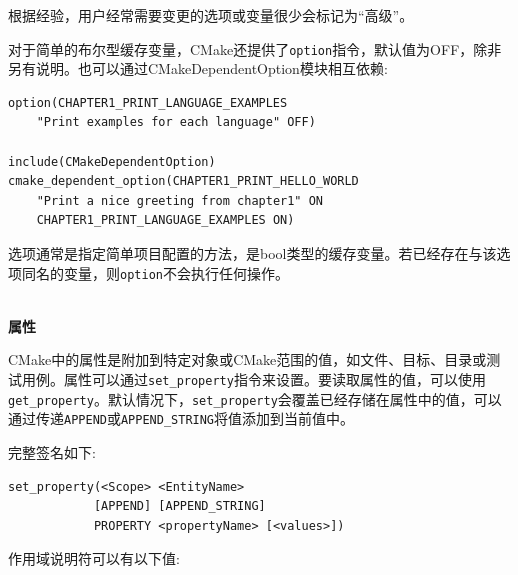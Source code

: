 根据经验，用户经常需要变更的选项或变量很少会标记为“高级”。

对于简单的布尔型缓存变量，CMake还提供了\texttt{option}指令，默认值为OFF，除非另有说明。也可以通过CMakeDependentOption模块相互依赖:

\begin{lstlisting}[style=styleCMake]
option(CHAPTER1_PRINT_LANGUAGE_EXAMPLES
	"Print examples for each language" OFF)

include(CMakeDependentOption)
cmake_dependent_option(CHAPTER1_PRINT_HELLO_WORLD
	"Print a nice greeting from chapter1" ON
	CHAPTER1_PRINT_LANGUAGE_EXAMPLES ON)
\end{lstlisting}

选项通常是指定简单项目配置的方法，是bool类型的缓存变量。若已经存在与该选项同名的变量，则\texttt{option}不会执行任何操作。

\hspace*{\fill} \\ %
\noindent
\textbf{属性}

CMake中的属性是附加到特定对象或CMake范围的值，如文件、目标、目录或测试用例。属性可以通过\texttt{set\_property}指令来设置。要读取属性的值，可以使用\texttt{get\_property}。默认情况下，\texttt{set\_property}会覆盖已经存储在属性中的值，可以通过传递\texttt{APPEND}或\texttt{APPEND\_STRING}将值添加到当前值中。

完整签名如下:

\begin{lstlisting}[style=styleCMake]
set_property(<Scope> <EntityName>
			[APPEND] [APPEND_STRING]
			PROPERTY <propertyName> [<values>])
\end{lstlisting}

作用域说明符可以有以下值:


